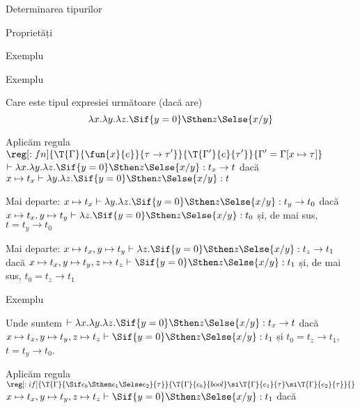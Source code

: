 \documentclass[xcolor=x11names,compress,10pt]{beamer}
\begin{document}
\begin{section}{Determinarea tipurilor}
\begin{subsection}{Proprietăți}
    \end{subsection}

    \begin{subsection}{Exemplu}
      \begin{frame}{Exemplu}
        \begin{block}{Care este tipul expresiei următoare (dacă are)}
          \[ \lambda x.\lambda y. \lambda z. \Sif {y = 0} \Sthen z \Selse {x / y}\]
        \end{block}

        \begin{block}{Aplicăm regula 
    $\displaystyle\reg[:fn]{\T{\Gamma}{\fun{x}{e}}{\tau \rightarrow \tau'}}{\T{\Gamma'}{e}{\tau'}}{\Gamma' = \Gamma[x\mapsto \tau]}$
    }
          $\vdash  \lambda x.\lambda y. \lambda z. \Sif {y = 0} \Sthen z \Selse {x / y} : t_x \rightarrow t$ dacă
          $x \mapsto t_x \vdash \lambda y. \lambda z. \Sif {y = 0} \Sthen z \Selse {x / y} : t$

          \pause Mai departe:
          $x \mapsto t_x \vdash \lambda y. \lambda z. \Sif {y = 0} \Sthen z \Selse {x / y} : t_y \rightarrow t_0$ dacă
          $x \mapsto t_x, y\mapsto t_y \vdash \lambda z. \Sif {y = 0} \Sthen z \Selse {x / y} : t_0$ și, de mai sus,
          $t = t_y \rightarrow t_0$

          \pause Mai departe: 
          $x \mapsto t_x, y\mapsto t_y \vdash \lambda z. \Sif {y = 0} \Sthen z \Selse {x / y} : t_z\rightarrow t_1$ dacă
          $x \mapsto t_x, y\mapsto t_y, z \mapsto t_z \vdash \Sif {y = 0} \Sthen z \Selse {x / y} : t_1$ și, de mai sus,
          $t_0 = t_z \rightarrow t_1$
        \end{block}
     
      \end{frame}

      \begin{frame}{Exemplu}
      \begin{block}{Unde suntem}
        $\vdash  \lambda x.\lambda y. \lambda z. \Sif {y = 0} \Sthen z \Selse {x / y} : t_x \rightarrow t$ dacă
        $x \mapsto t_x, y\mapsto t_y, z \mapsto t_z \vdash \Sif {y = 0} \Sthen z \Selse {x / y} : t_1$ și
        $t_0 = t_z \rightarrow t_1$, $t = t_y \rightarrow t_0$.
      \end{block}
        \begin{block}{Aplicăm regula 
    $\reg[:if]{\T{\Gamma}{\Sif e_b \Sthen e_1 \Selse e_2}{\tau}}{\T{\Gamma}{e_b}{bool} \si \T{\Gamma}{e_1}{\tau} \si \T{\Gamma}{e_2}{\tau}}{}$
    }
        $x \mapsto t_x, y\mapsto t_y, z \mapsto t_z \vdash \Sif {y = 0} \Sthen z \Selse {x / y} : t_1$ dacă


\end{block}
\end{frame}
\end{subsection}
\end{section}
\end{document}
